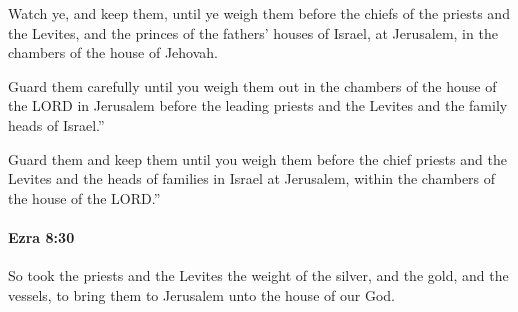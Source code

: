 			\begin{versebox}
					\item[BHS] 
					\item[LXX] 
					\item[ASV] Watch ye, and keep them, until ye weigh them before the chiefs of the priests and the Levites, and the princes of the fathers' houses of Israel, at Jerusalem, in the chambers of the house of Jehovah.
					\item[NIV] Guard them carefully until you weigh them out in the chambers of the house of the LORD in Jerusalem before the leading priests and the Levites and the family heads of Israel.”
					\item[NRSV] Guard them and keep them until you weigh them before the chief priests and the Levites and the heads of families in Israel at Jerusalem, within the chambers of the house of the LORD.”
			\end{versebox}

		\paragraph{Ezra 8:30} %
			\label{EZRA-8-30}

			So took the priests and the Levites the weight of the silver, and the gold, and the vessels, to bring them to Jerusalem unto the house of our God.

